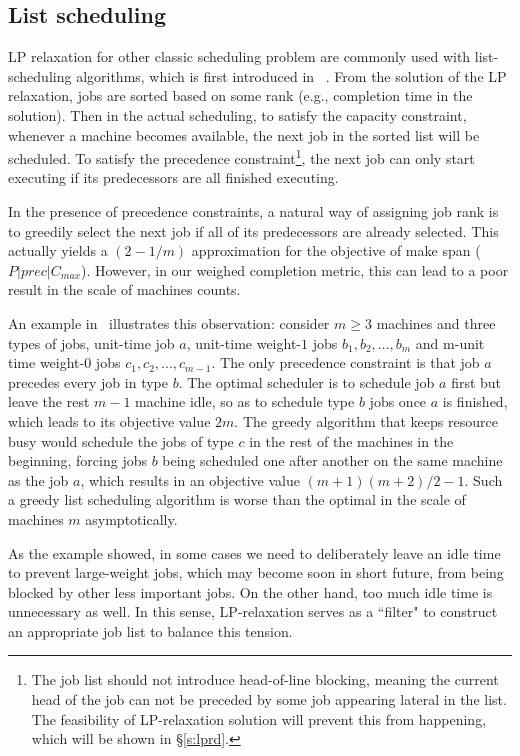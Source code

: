 \subsection{List scheduling} \label{s:lst}
LP relaxation for other classic scheduling problem are commonly used with list-scheduling algorithms, which is first introduced in ~\cite{graham1966bounds}. From the solution of the LP relaxation, jobs are sorted based on some rank (e.g., completion time in the solution). Then in the actual scheduling, to satisfy the capacity constraint, whenever a machine becomes available, the next job in the sorted list will be scheduled. To satisfy the precedence constraint\footnote{The job list should not introduce head-of-line blocking, meaning the current head of the job can not be preceded by some job appearing lateral in the list. The feasibility of LP-relaxation solution will prevent this from happening, which will be shown in \S\ref{s:lprd}.}, the next job can only start executing if its predecessors are all finished executing. 

In the presence of precedence constraints, a natural way of assigning job rank is to greedily select the next job if all of its predecessors are already selected. This actually yields a $(2-1/m)$ approximation for the objective of make span ($P|prec|C_{max}$). However, in our weighed completion metric, this can lead to a poor result in the scale of machines counts. 

An example in~\cite{queyranne2006approximation} illustrates this observation: consider $m\geq 3$ machines and three types of jobs, unit-time job $a$, unit-time weight-$1$ jobs $b_1, b_2, ..., b_m$ and m-unit time weight-0 jobs $c_1, c_2, ..., c_{m-1}$. The only precedence constraint is that job $a$ precedes every job in type $b$. The optimal scheduler is to schedule job $a$ first but leave the rest $m-1$ machine idle, so as to schedule type $b$ jobs once $a$ is finished, which leads to its objective value $2m$. The greedy algorithm that keeps resource busy would schedule the jobs of type $c$ in the rest of the machines in the beginning, forcing jobs $b$ being scheduled one after another on the same machine as the job $a$, which results in an objective value $(m+1)(m+2)/2 -1$. Such a greedy list scheduling algorithm is worse than the optimal in the scale of machines $m$ asymptotically.

As the example showed, in some cases we need to deliberately leave an idle time to prevent large-weight jobs, which may become soon in short future, from being blocked by other less important jobs. On the other hand, too much idle time is unnecessary as well. In this sense, LP-relaxation serves as a ``filter" to construct an appropriate job list to balance this tension. 

